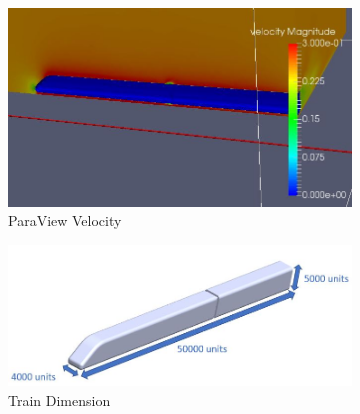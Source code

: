 \documentclass[
	12pt, %
]{fphw}
\begin{document}
\begin{enumerate}[(\itshape 1\normalfont)]
\begin{figure}[h]
\begin{subfigure}[h]{0.4\textwidth}
        \label{fig:1c1}
    \end{subfigure}
    ~ 
    \begin{subfigure}[h]{0.4\textwidth}
        \includegraphics[width=\textwidth]{4f.jpg}
        \caption{ParaView Velocity}
        \label{fig:1c1}
    \end{subfigure}
    \caption{ParaView Measurement}\label{fig:1c}
     \begin{subfigure}[h]{0.5\textwidth}
        \includegraphics[width=\textwidth]{5a.jpg}
        \caption{Train Dimension}
        \label{fig:1c1}
    \end{subfigure}
    ~ 
    \begin{subfigure}[h]{0.4\textwidth}

\end{subfigure}
\end{figure}
\end{enumerate}
\end{document}

